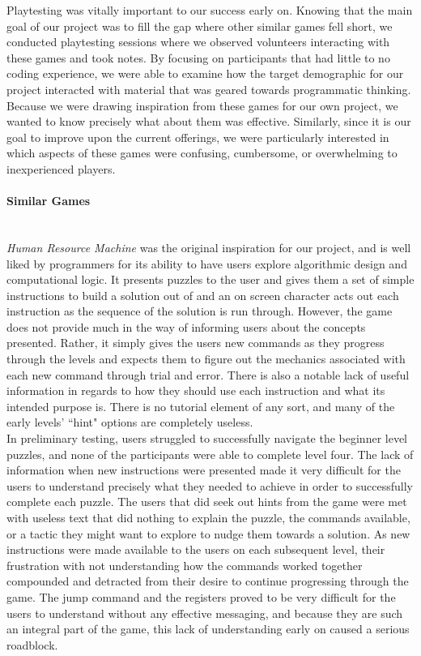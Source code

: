 Playtesting was vitally important to our success early on. Knowing that the 
main goal of our project was to fill the gap where other similar games fell 
short, we conducted playtesting sessions where we observed volunteers 
interacting with these games and took notes. By focusing on participants 
that had little to no coding experience, we were able to examine how the 
target demographic for our project interacted with material that was geared 
towards programmatic thinking. Because we were drawing inspiration from 
these games for our own project, we wanted to know precisely what about 
them was effective. Similarly, since it is our goal to improve upon the current 
offerings, we were particularly interested in which aspects of these games 
were confusing, cumbersome, or overwhelming to inexperienced players.\\

\paragraph{Similar Games}\mbox{} \\
\textit{Human Resource Machine} was the original inspiration for our project,
 and is well liked by programmers for its ability to have users explore algorithmic 
design and computational logic. It presents puzzles to the user and gives them a 
set of simple instructions to build a solution out of and an on screen character 
acts out each instruction as the sequence of the solution is run through. However, 
the game does not provide much in the way of informing users about the concepts 
presented. Rather, it simply gives the users new commands as they progress through 
the levels and expects them to figure out the mechanics associated with each new 
command through trial and error. There is also a notable lack of useful information 
in regards to how they should use each instruction and what its intended purpose 
is. There is no tutorial element of any sort, and many of the early levels' ``hint" options 
are completely useless.\\

In preliminary testing, users struggled to successfully navigate the beginner level 
puzzles, and none of the participants were able to complete level four. The lack of 
information when new instructions were presented made it very difficult for the users 
to understand precisely what they needed to achieve in order to successfully complete 
each puzzle. The users that did seek out hints from the game were met with useless 
text that did nothing to explain the puzzle, the commands available, or a tactic they 
might want to explore to nudge them towards a solution. As new instructions were 
made available to the users on each subsequent level, their frustration with not 
understanding how the commands worked together compounded and detracted 
from their desire to continue progressing through the game. The jump command 
and the registers proved to be very difficult for the users to understand without 
any effective messaging, and because they are such an integral part of the game, 
this lack of understanding early on caused a serious roadblock.\\

